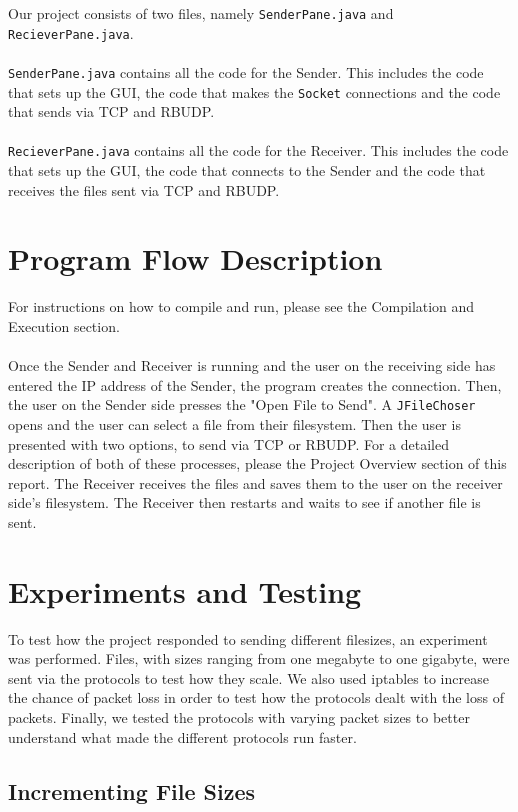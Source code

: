 \documentclass[13pt]{article}
\begin{document}
Our project consists of two files, namely \texttt{SenderPane.java} and
\texttt{RecieverPane.java}.
\\\\
\texttt{SenderPane.java} contains all the code for the Sender. This includes the
code that sets up the GUI, the code that makes the \texttt{Socket} connections
and the code that sends via TCP and RBUDP.
\\\\
\texttt{RecieverPane.java} contains all the code for the Receiver. This includes the
code that sets up the GUI, the code that connects to the Sender and the code that
receives the files sent via TCP and RBUDP.

\section{Program Flow Description}

For instructions on how to compile and run, please see the Compilation and Execution
section.
\\\\
Once the Sender and Receiver is running and the user on the receiving side has
entered the IP address of the Sender, the program creates the connection. Then,
the user on the Sender side presses the "Open File to Send". A \texttt{JFileChoser}
opens and the user can select a file from their filesystem. Then the user is presented
with two options, to send via TCP or RBUDP. For a detailed description of both of
these processes, please the Project Overview section of this report. The Receiver
receives the files and saves them to the user on the receiver side's filesystem.
The Receiver then restarts and waits to see if another file is sent.

\section{Experiments and Testing}

To test how the project responded to sending different filesizes, an experiment
was performed. Files, with sizes ranging from one megabyte to one gigabyte,
were sent via the protocols to test how they scale. We also used iptables to
increase the chance of packet loss in order to test how the protocols dealt with
the loss of packets. Finally, we tested the protocols with varying packet sizes to 
better understand what made the different protocols run faster.

\subsection{Incrementing File Sizes}
\end{document}
